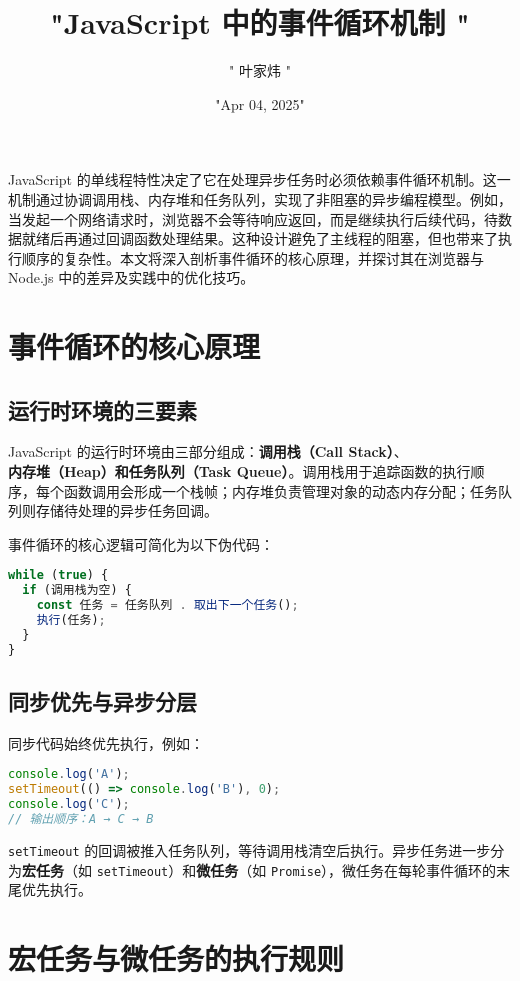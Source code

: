 \title{"JavaScript 中的事件循环机制 "}
\author{" 叶家炜 "}
\date{"Apr 04, 2025"}
\maketitle
JavaScript 的单线程特性决定了它在处理异步任务时必须依赖事件循环机制。这一机制通过协调调用栈、内存堆和任务队列，实现了非阻塞的异步编程模型。例如，当发起一个网络请求时，浏览器不会等待响应返回，而是继续执行后续代码，待数据就绪后再通过回调函数处理结果。这种设计避免了主线程的阻塞，但也带来了执行顺序的复杂性。本文将深入剖析事件循环的核心原理，并探讨其在浏览器与 Node.js 中的差异及实践中的优化技巧。\par
\chapter{事件循环的核心原理}
\section{运行时环境的三要素}
JavaScript 的运行时环境由三部分组成：\textbf{调用栈（Call Stack）}、\textbf{内存堆（Heap）\textbf{和}任务队列（Task Queue）}。调用栈用于追踪函数的执行顺序，每个函数调用会形成一个栈帧；内存堆负责管理对象的动态内存分配；任务队列则存储待处理的异步任务回调。\par
事件循环的核心逻辑可简化为以下伪代码：\par
\begin{lstlisting}[language=javascript]
while (true) {
  if (调用栈为空) {
    const 任务 = 任务队列 . 取出下一个任务();
    执行(任务);
  }
}
\end{lstlisting}
\section{同步优先与异步分层}
同步代码始终优先执行，例如：\par
\begin{lstlisting}[language=javascript]
console.log('A');
setTimeout(() => console.log('B'), 0);
console.log('C');
// 输出顺序：A → C → B
\end{lstlisting}
\verb!setTimeout! 的回调被推入任务队列，等待调用栈清空后执行。异步任务进一步分为\textbf{宏任务}（如 \verb!setTimeout!）和\textbf{微任务}（如 \verb!Promise!），微任务在每轮事件循环的末尾优先执行。\par
\chapter{宏任务与微任务的执行规则}
